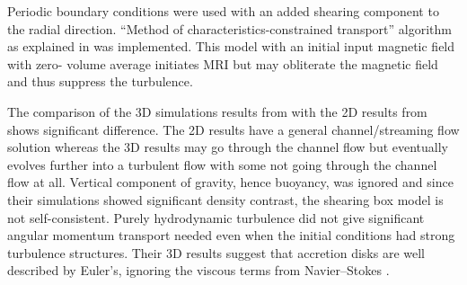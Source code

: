 \documentclass{jfm}
\begin{document}
Periodic boundary conditions were used with an added shearing component to the
radial direction. ``Method of characteristics-constrained transport'' algorithm
as explained in \cite{Hawley1995} was implemented. This model with an initial
input magnetic field with zero- volume average initiates MRI but may obliterate
the magnetic field and thus suppress the turbulence. 

The comparison of the 3D simulations results from \cite{Hawley1995} with the 2D
results from \cite{Balbus1994} shows significant difference. The 2D results
have a general channel/streaming flow solution whereas the 3D results may go
through the channel flow but eventually evolves further into a turbulent flow
with some not going through the channel flow at all. Vertical component of
gravity, hence buoyancy, was ignored and since their simulations showed
significant density contrast, the shearing box model is not self-consistent.
Purely hydrodynamic turbulence did not give significant angular momentum
transport needed even when the initial conditions had strong turbulence
structures. Their 3D results suggest that accretion disks are well described by
Euler's, ignoring the viscous terms from Navier--Stokes \citep{Hawley1995}.
\end{document}
